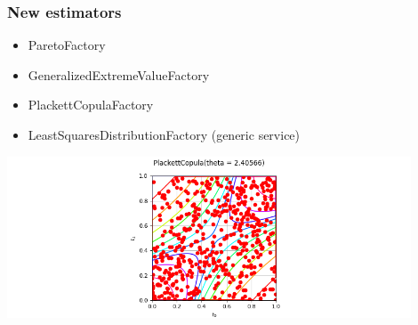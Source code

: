 \documentclass{beamer}
\begin{document}
\begin{frame}
\frametitle{New estimators}

\begin{itemize}
\item ParetoFactory
\item GeneralizedExtremeValueFactory
\item PlackettCopulaFactory
\item LeastSquaresDistributionFactory (generic service)
\end{itemize}


\begin{center}
  \includegraphics[width=0.9\textwidth]{figures/openturns-PlackettCopulaFactory-1.png}
\end{center}

\end{frame}
\end{document}
